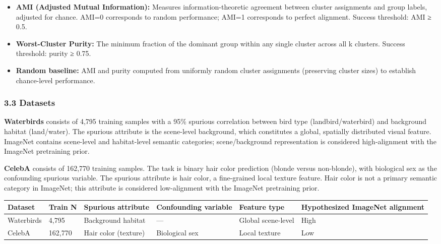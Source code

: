 \begin{itemize}
\item \textbf{AMI (Adjusted Mutual Information):} Measures information-theoretic agreement between cluster assignments and group labels, adjusted for chance. AMI=0 corresponds to random performance; AMI=1 corresponds to perfect alignment. Success threshold: AMI ≥ 0.5.
\item \textbf{Worst-Cluster Purity:} The minimum fraction of the dominant group within any single cluster across all k clusters. Success threshold: purity ≥ 0.75.
\item \textbf{Random baseline:} AMI and purity computed from uniformly random cluster assignments (preserving cluster sizes) to establish chance-level performance.
\end{itemize}

\subsubsection{3.3 Datasets}

\textbf{Waterbirds} \citep{Sagawaetal2020} consists of 4,795 training samples with a 95\% spurious correlation between bird type (landbird/waterbird) and background habitat (land/water). The spurious attribute is the scene-level background, which constitutes a global, spatially distributed visual feature. ImageNet contains scene-level and habitat-level semantic categories; scene/background representation is considered high-alignment with the ImageNet pretraining prior.

\textbf{CelebA} \citep{Liuetal2015} consists of 162,770 training samples. The task is binary hair color prediction (blonde versus non-blonde), with biological sex as the confounding spurious variable. The spurious attribute is hair color, a fine-grained local texture feature. Hair color is not a primary semantic category in ImageNet; this attribute is considered low-alignment with the ImageNet pretraining prior.

\begin{table}[htbp]
\centering
\begin{tabular}{llllll}
\toprule
Dataset & Train N & Spurious attribute & Confounding variable & Feature type & Hypothesized ImageNet alignment \\
\midrule
Waterbirds & 4,795 & Background habitat & — & Global scene-level & High \\
CelebA & 162,770 & Hair color (texture) & Biological sex & Local texture & Low \\
\bottomrule
\end{tabular}
\end{table}

